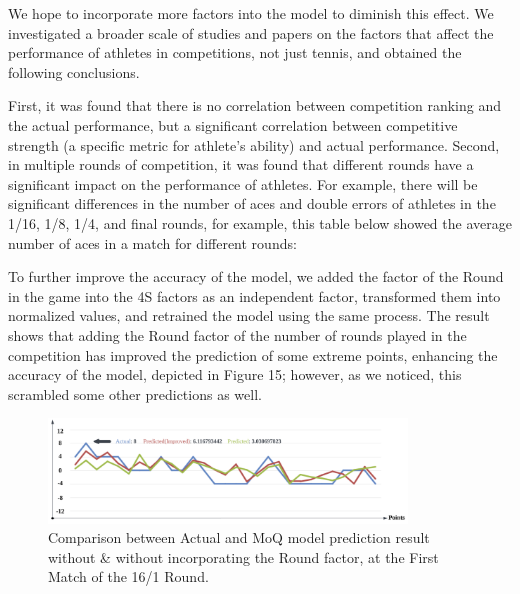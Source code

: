 \documentclass[12pt]{article}  %
\begin{document}
We hope to incorporate more factors into the model to diminish this effect. We investigated a broader scale of studies and papers \cite{17}\cite{18} on the factors that affect the performance of athletes in competitions, not just tennis, and obtained the following conclusions.

First, it was found that there is no correlation between competition ranking and the actual performance, but a significant correlation between competitive strength (a specific metric for athlete's ability) and actual performance. Second, in multiple rounds of competition, it was found that different rounds have a significant impact on the performance of athletes. For example, there will be significant differences in the number of aces and double errors of athletes in the 1/16, 1/8, 1/4, and final rounds, for example, this table below showed the average number of aces in a match for different rounds:

\begin{table}[htbp]
	\centering
	\caption{Different Rounds can Impact Player Performance, Exampled by the Number of Aces}
\end{table}

To further improve the accuracy of the model, we added the factor of the Round in the game into the 4S factors as an independent factor, transformed them into normalized values, and retrained the model using the same process. The result shows that adding the Round factor of the number of rounds played in the competition has improved the prediction of some extreme points, enhancing the accuracy of the model, depicted in Figure 15; however, as we noticed, this scrambled some other predictions as well.

\begin{figure}[htbp]  %
	\centering  %
	\includegraphics[width=0.85\textwidth]{corrected.png} %
	\caption{\centering Comparison between Actual and MoQ model prediction result without \& without incorporating the Round factor, at the First Match of the 16/1 Round.} %
\end{figure}
\vspace{-0.2cm}
\end{document}
